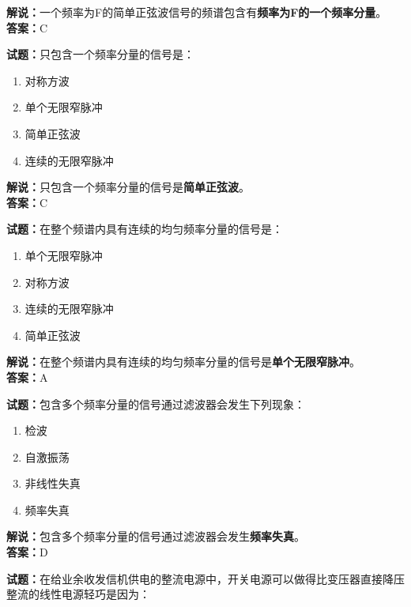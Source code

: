 \documentclass{ctexbook}
\begin{document}
\noindent\textbf{解说：}一个频率为F的简单正弦波信号的频谱包含有\textbf{频率为F的一个频率分量}。\\\noindent\textbf{答案：}C


\bigskip


\noindent\textbf{试题：}只包含一个频率分量的信号是：
\begin{enumerate}[leftmargin=3em]
	\item 对称方波
	\item 单个无限窄脉冲
	\item 简单正弦波
	\item 连续的无限窄脉冲
\end{enumerate}

\noindent\textbf{解说：}只包含一个频率分量的信号是\textbf{简单正弦波}。\\\noindent\textbf{答案：}C


\bigskip


\noindent\textbf{试题：}在整个频谱内具有连续的均匀频率分量的信号是：

\begin{enumerate}[leftmargin=3em]
	\item 单个无限窄脉冲
	\item 对称方波
	\item 连续的无限窄脉冲
	\item 简单正弦波
\end{enumerate}

\noindent\textbf{解说：}在整个频谱内具有连续的均匀频率分量的信号是\textbf{单个无限窄脉冲}。\\\noindent\textbf{答案：}A


\bigskip


\noindent\textbf{试题：}包含多个频率分量的信号通过滤波器会发生下列现象：

\begin{enumerate}[leftmargin=3em]
	\item 检波
	\item 自激振荡
	\item 非线性失真
	\item 频率失真
\end{enumerate}

\noindent\textbf{解说：}包含多个频率分量的信号通过滤波器会发生\textbf{频率失真}。\\\noindent\textbf{答案：}D



\bigskip


\noindent\textbf{试题：}在给业余收发信机供电的整流电源中，开关电源可以做得比变压器直接降压整流的线性电源轻巧是因为：
\end{document}

